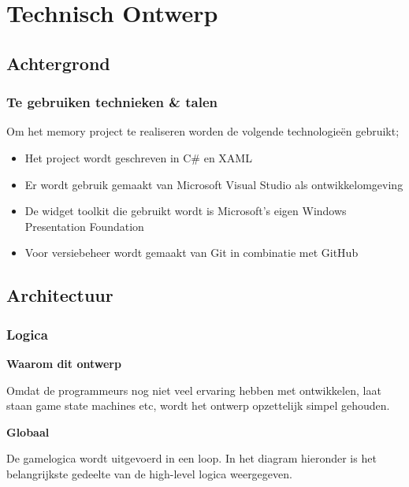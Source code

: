 \documentclass[a4paper,titlepage,11pt]{article}
\begin{document}
\clearpage

\section{Technisch Ontwerp}

\subsection{Achtergrond}

\subsubsection{Te gebruiken technieken \& talen}

Om het memory project te realiseren worden de volgende technologieën gebruikt;
\begin{itemize}
\item Het project wordt geschreven in C\# en XAML
\item Er wordt gebruik gemaakt van Microsoft Visual Studio als ontwikkelomgeving
\item De widget toolkit die gebruikt wordt is Microsoft’s eigen Windows Presentation Foundation
\item Voor versiebeheer wordt gemaakt van Git in combinatie met GitHub
\end{itemize}

\subsection{Architectuur}

\subsubsection{Logica}


{\bf Waarom dit ontwerp}

Omdat de programmeurs nog niet veel ervaring hebben met ontwikkelen, laat staan
game state machines etc, wordt het ontwerp opzettelijk simpel gehouden.

{\bf Globaal}

De gamelogica wordt uitgevoerd in een loop. 
In het diagram hieronder is het belangrijkste gedeelte
van de high-level logica weergegeven. 
\end{document}
